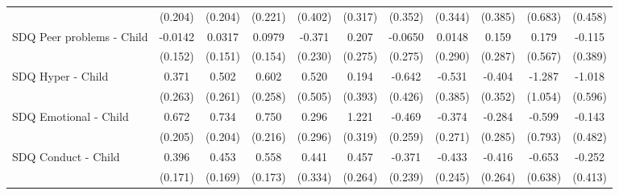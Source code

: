 {\begin{tabular}{l*{10}{c}}
            &     (0.204)         &     (0.204)         &     (0.221)         &     (0.402)         &     (0.317)         &     (0.352)         &     (0.344)         &     (0.385)         &     (0.683)         &     (0.458)         \\
\addlinespace
SDQ Peer problems - Child&     -0.0142         &      0.0317         &      0.0979         &      -0.371         &       0.207         &     -0.0650         &      0.0148         &       0.159         &       0.179         &      -0.115         \\
            &     (0.152)         &     (0.151)         &     (0.154)         &     (0.230)         &     (0.275)         &     (0.275)         &     (0.290)         &     (0.287)         &     (0.567)         &     (0.389)         \\
\addlinespace
SDQ Hyper - Child&       0.371         &       0.502         &       0.602\sym{*}  &       0.520         &       0.194         &      -0.642         &      -0.531         &      -0.404         &      -1.287         &      -1.018         \\
            &     (0.263)         &     (0.261)         &     (0.258)         &     (0.505)         &     (0.393)         &     (0.426)         &     (0.385)         &     (0.352)         &     (1.054)         &     (0.596)         \\
\addlinespace
SDQ Emotional - Child&       0.672\sym{**} &       0.734\sym{***}&       0.750\sym{***}&       0.296         &       1.221\sym{***}&      -0.469         &      -0.374         &      -0.284         &      -0.599         &      -0.143         \\
            &     (0.205)         &     (0.204)         &     (0.216)         &     (0.296)         &     (0.319)         &     (0.259)         &     (0.271)         &     (0.285)         &     (0.793)         &     (0.482)         \\
\addlinespace
SDQ Conduct - Child&       0.396\sym{*}  &       0.453\sym{**} &       0.558\sym{**} &       0.441         &       0.457         &      -0.371         &      -0.433         &      -0.416         &      -0.653         &      -0.252         \\
            &     (0.171)         &     (0.169)         &     (0.173)         &     (0.334)         &     (0.264)         &     (0.239)         &     (0.245)         &     (0.264)         &     (0.638)         &     (0.413)         \\
\bottomrule
\end{tabular}
}
